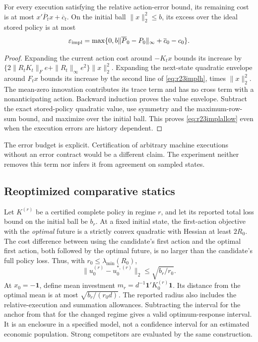 \begin{proposition}\label{prop:r23implementation}
For every execution satisfying the relative action-error bound, its remaining
cost is at most $x'\overline P_tx+\overline c_t$. On the initial ball
$\|x\|_2^2\leq b$, its excess over the ideal stored policy is at most
\begin{equation}
 \varepsilon_{\rm impl}
 =\max\{0,b\|\overline P_0-P_0\|_\infty+
                         \overline c_0-c_0\}.
 \label{eq:r23implallow}
\end{equation}
\end{proposition}
\begin{proof}
Expanding the current action cost around $-K_tx$ bounds its increase by
$\{2\|R_tK_t\|_F e+\|R_t\|_\infty e^2\}\|x\|_2^2$.
Expanding the next-state quadratic envelope around $F_tx$ bounds its
increase by the second line of \eqref{eq:r23implh}, times $\|x\|_2^2$.
The mean-zero innovation contributes its trace term and has no cross term
with a nonanticipating action. Backward induction proves the value envelope.
Subtract the exact stored-policy quadratic value, use symmetry and the
maximum-row-sum bound, and maximize over the initial ball. This proves
\eqref{eq:r23implallow} even when the execution errors are history dependent.
\end{proof}

The error budget is explicit. Certification of arbitrary machine executions
without an error contract would be a different claim. The experiment neither
removes this term nor infers it from agreement on sampled states.

\subsection{Reoptimized comparative statics}
Let $K^{(r)}$ be a certified complete policy in regime $r$, and let its
reported total loss bound on the initial ball be $b_r$. At a fixed initial
state, the first-action objective with the \emph{optimal} future is a strictly
convex quadratic with Hessian at least $2R_0$. The cost difference between
using the candidate's first action and the optimal first action, both followed
by the optimal future, is no larger than the candidate's full policy loss.
Thus, with $r_0\leq\lambda_{\min}(R_0)$,
\begin{equation}
 \|u_0^{(r)}-u_0^{*,(r)}\|_2\leq\sqrt{b_r/r_0}.
 \label{eq:r23actionradius}
\end{equation}
At $x_0=-\mathbf1$, define mean investment
$m_r=d^{-1}\mathbf1'K_0^{(r)}\mathbf1$. Its distance from the optimal mean
is at most $\sqrt{b_r/(r_0d)}$. The reported radius also includes the
relative-execution and summation allowances. Subtracting the interval for
the anchor from that for the changed regime gives a valid optimum-response
interval. It is an enclosure in a specified model, not a confidence interval
for an estimated economic population. Strong competitors are evaluated by
the same construction.

